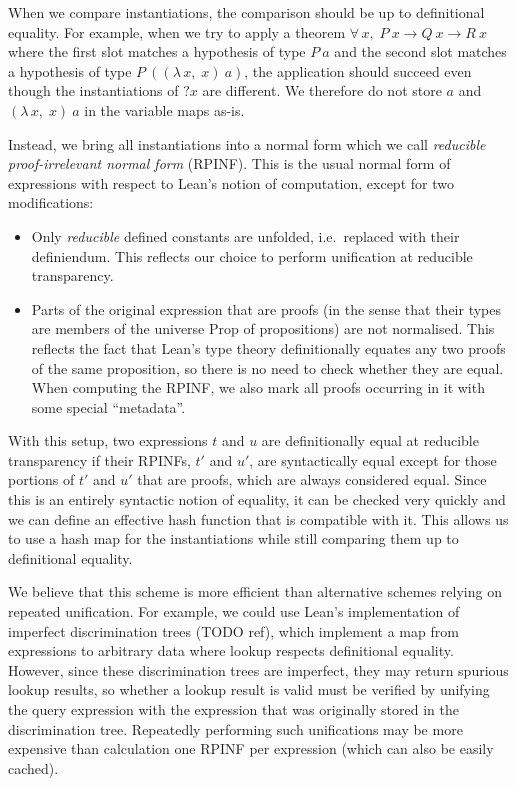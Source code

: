 \documentclass[runningheads]{llncs}
\newcommand{\Lam}[2]{\ensuremath{\lambda\, #1,\; #2}}
\newcommand{\All}[2]{\ensuremath{\forall\, #1,\; #2}}
\newcommand{\mvar}[1]{\ensuremath{?#1}}
\newcommand{\Prop}{\ensuremath{\mathrm{Prop}}}
\begin{document}
When we compare instantiations, the comparison should be up to definitional equality.
For example, when we try to apply a theorem $\All{x}{P~x → Q~x → R~x}$ where the first slot matches a hypothesis of type $P~a$ and the second slot matches a hypothesis of type $P~((\Lam{x}{x})~a)$, the application should succeed even though the instantiations of $\mvar{x}$ are different.
We therefore do not store $a$ and $(\Lam{x}{x})~a$ in the variable maps as-is.

Instead, we bring all instantiations into a normal form which we call \emph{reducible proof-irrelevant normal form} (RPINF).
This is the usual normal form of expressions with respect to Lean's notion of computation, except for two modifications:
\begin{itemize}
  \item Only \emph{reducible} defined constants are unfolded, i.e.\ replaced with their definiendum.
        This reflects our choice to perform unification at reducible transparency.
  \item Parts of the original expression that are proofs (in the sense that their types are members of the universe $\Prop$ of propositions) are not normalised.
        This reflects the fact that Lean's type theory definitionally equates any two proofs of the same proposition, so there is no need to check whether they are equal.
        When computing the RPINF, we also mark all proofs occurring in it with some special \enquote{metadata}.
\end{itemize}

With this setup, two expressions $t$ and $u$ are definitionally equal at reducible transparency if their RPINFs, $t'$ and $u'$, are syntactically equal except for those portions of $t'$ and $u'$ that are proofs, which are always considered equal.
Since this is an entirely syntactic notion of equality, it can be checked very quickly and we can define an effective hash function that is compatible with it.
This allows us to use a hash map for the instantiations while still comparing them up to definitional equality.

We believe that this scheme is more efficient than alternative schemes relying on repeated unification.
For example, we could use Lean's implementation of imperfect discrimination trees (TODO ref), which implement a map from expressions to arbitrary data where lookup respects definitional equality.
However, since these discrimination trees are imperfect, they may return spurious lookup results, so whether a lookup result is valid must be verified by unifying the query expression with the expression that was originally stored in the discrimination tree.
Repeatedly performing such unifications may be more expensive than calculation one RPINF per expression (which can also be easily cached).
\end{document}
